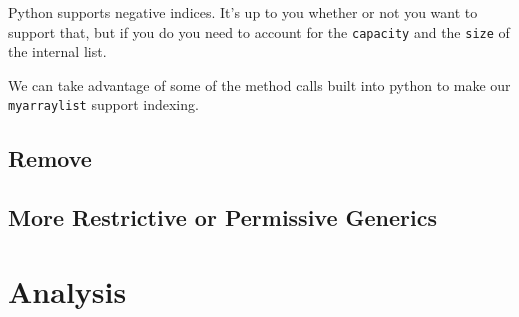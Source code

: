Python supports negative indices.  It's up to you whether or not you want to support that, but if you do you need to account for the \texttt{capacity} and the \texttt{size} of the internal list.


We can take advantage of some of the method calls built into python to make our \texttt{myarraylist} support indexing.


\subsection{Remove}



\subsection{More Restrictive or Permissive Generics}

\section{Analysis}


